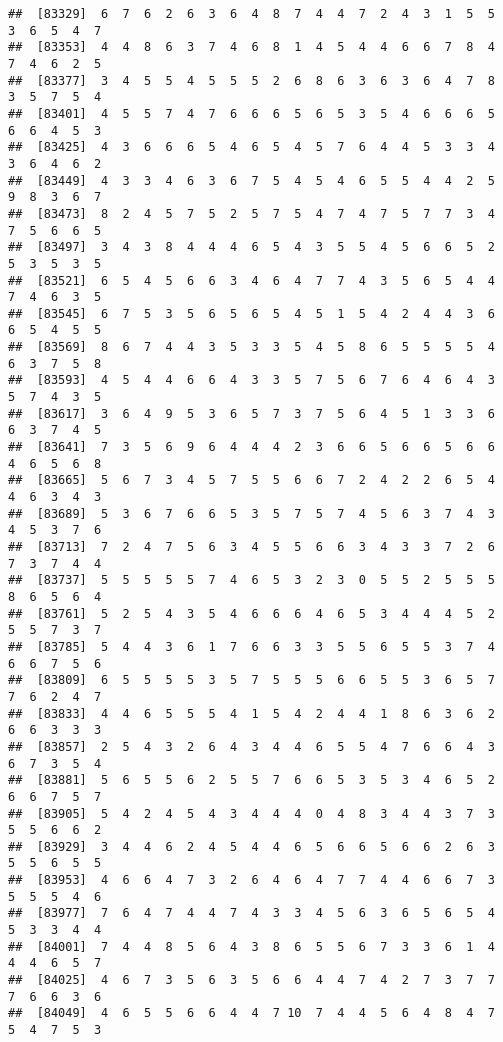 \documentclass[
]{book}
\begin{document}
\begin{verbatim}
##  [83329]  6  7  6  2  6  3  6  4  8  7  4  4  7  2  4  3  1  5  5  3  6  5  4  7
##  [83353]  4  4  8  6  3  7  4  6  8  1  4  5  4  4  6  6  7  8  4  7  4  6  2  5
##  [83377]  3  4  5  5  4  5  5  5  2  6  8  6  3  6  3  6  4  7  8  3  5  7  5  4
##  [83401]  4  5  5  7  4  7  6  6  6  5  6  5  3  5  4  6  6  6  5  6  6  4  5  3
##  [83425]  4  3  6  6  6  5  4  6  5  4  5  7  6  4  4  5  3  3  4  3  6  4  6  2
##  [83449]  4  3  3  4  6  3  6  7  5  4  5  4  6  5  5  4  4  2  5  9  8  3  6  7
##  [83473]  8  2  4  5  7  5  2  5  7  5  4  7  4  7  5  7  7  3  4  7  5  6  6  5
##  [83497]  3  4  3  8  4  4  4  6  5  4  3  5  5  4  5  6  6  5  2  5  3  5  3  5
##  [83521]  6  5  4  5  6  6  3  4  6  4  7  7  4  3  5  6  5  4  4  7  4  6  3  5
##  [83545]  6  7  5  3  5  6  5  6  5  4  5  1  5  4  2  4  4  3  6  6  5  4  5  5
##  [83569]  8  6  7  4  4  3  5  3  3  5  4  5  8  6  5  5  5  5  4  6  3  7  5  8
##  [83593]  4  5  4  4  6  6  4  3  3  5  7  5  6  7  6  4  6  4  3  5  7  4  3  5
##  [83617]  3  6  4  9  5  3  6  5  7  3  7  5  6  4  5  1  3  3  6  6  3  7  4  5
##  [83641]  7  3  5  6  9  6  4  4  4  2  3  6  6  5  6  6  5  6  6  4  6  5  6  8
##  [83665]  5  6  7  3  4  5  7  5  5  6  6  7  2  4  2  2  6  5  4  4  6  3  4  3
##  [83689]  5  3  6  7  6  6  5  3  5  7  5  7  4  5  6  3  7  4  3  4  5  3  7  6
##  [83713]  7  2  4  7  5  6  3  4  5  5  6  6  3  4  3  3  7  2  6  7  3  7  4  4
##  [83737]  5  5  5  5  5  7  4  6  5  3  2  3  0  5  5  2  5  5  5  8  6  5  6  4
##  [83761]  5  2  5  4  3  5  4  6  6  6  4  6  5  3  4  4  4  5  2  5  5  7  3  7
##  [83785]  5  4  4  3  6  1  7  6  6  3  3  5  5  6  5  5  3  7  4  6  6  7  5  6
##  [83809]  6  5  5  5  5  3  5  7  5  5  5  6  6  5  5  3  6  5  7  7  6  2  4  7
##  [83833]  4  4  6  5  5  5  4  1  5  4  2  4  4  1  8  6  3  6  2  6  6  3  3  3
##  [83857]  2  5  4  3  2  6  4  3  4  4  6  5  5  4  7  6  6  4  3  6  7  3  5  4
##  [83881]  5  6  5  5  6  2  5  5  7  6  6  5  3  5  3  4  6  5  2  6  6  7  5  7
##  [83905]  5  4  2  4  5  4  3  4  4  4  0  4  8  3  4  4  3  7  3  5  5  6  6  2
##  [83929]  3  4  4  6  2  4  5  4  4  6  5  6  6  5  6  6  2  6  3  5  5  6  5  5
##  [83953]  4  6  6  4  7  3  2  6  4  6  4  7  7  4  4  6  6  7  3  5  5  5  4  6
##  [83977]  7  6  4  7  4  4  7  4  3  3  4  5  6  3  6  5  6  5  4  5  3  3  4  4
##  [84001]  7  4  4  8  5  6  4  3  8  6  5  5  6  7  3  3  6  1  4  4  4  6  5  7
##  [84025]  4  6  7  3  5  6  3  5  6  6  4  4  7  4  2  7  3  7  7  7  6  6  3  6
##  [84049]  4  6  5  5  6  6  4  4  7 10  7  4  4  5  6  4  8  4  7  5  4  7  5  3

\end{verbatim}
\end{document}
